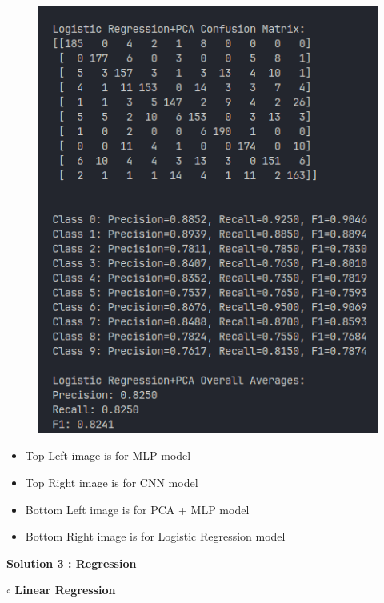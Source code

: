 \documentclass{article}
\begin{document}
\begin{itemize}
\begin{figure}[h]
\begin{minipage}{0.45\textwidth}
        \includegraphics[width=\linewidth]{4.png}
    \end{minipage}
    
\end{figure}

\begin{itemize}
    \item Top Left image is for MLP model
    \item Top Right image is for CNN model
    \item Bottom Left image is for PCA + MLP model
    \item Bottom Right image is for Logistic Regression model
\end{itemize}


\end{itemize}
\newpage

\noindent    \textbf{Solution 3 : Regression}
\vspace{7pt}

\noindent $\circ$ \textbf{Linear Regression}
\end{document}
